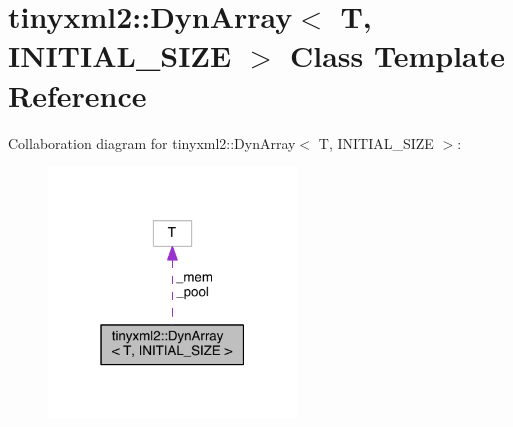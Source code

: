 \hypertarget{classtinyxml2_1_1_dyn_array}{}\section{tinyxml2\+:\+:Dyn\+Array$<$ T, I\+N\+I\+T\+I\+A\+L\+\_\+\+S\+I\+Z\+E $>$ Class Template Reference}
\label{classtinyxml2_1_1_dyn_array}


Collaboration diagram for tinyxml2\+:\+:Dyn\+Array$<$ T, I\+N\+I\+T\+I\+A\+L\+\_\+\+S\+I\+Z\+E $>$\+:\nopagebreak
\begin{figure}[H]
\begin{center}
\leavevmode
\includegraphics[width=187pt]{classtinyxml2_1_1_dyn_array__coll__graph}
\end{center}
\end{figure}
